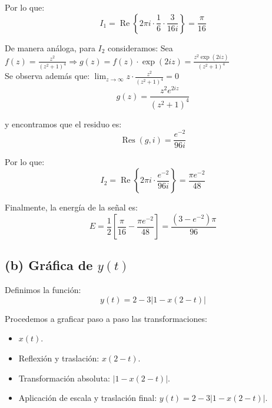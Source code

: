 \documentclass[a4paper,12pt]{article}
\begin{document}
Por lo que:
\begin{equation*}
    I_1 = \operatorname{Re} \left\{ 2 \pi i \cdot \frac{1}{6} \cdot \frac{3}{16 i} \right\} = \frac{\pi}{16}
\end{equation*}

De manera análoga, para $I_2$ consideramos:
Sea\\
$f(z)=\frac{z^{2}}{\left(z^{2}+1\right)^{4}} \Rightarrow g(z)=f(z) \cdot \exp (2 i z)=\frac{z^{2} \exp (2 i z)}{\left(z^{2}+1\right)^{4}}$\\
Se observa además que: $\lim _{z \rightarrow \infty} z \cdot \frac{z^{2}}{\left(z^{2}+1\right)^{4}}=0$\\
\begin{equation*}
    g(z) = \frac{z^2 e^{2iz}}{(z^2+1)^4}
\end{equation*}

y encontramos que el residuo es:
\begin{equation*}
    \operatorname{Res}(g, i) = \frac{e^{-2}}{96 i}
\end{equation*}

Por lo que:
\begin{equation*}
    I_2 = \operatorname{Re} \left\{ 2 \pi i \cdot \frac{e^{-2}}{96 i} \right\} = \frac{\pi e^{-2}}{48}
\end{equation*}

Finalmente, la energía de la señal es:
\begin{equation*}
    E = \frac{1}{2} \left[ \frac{\pi}{16} - \frac{\pi e^{-2}}{48} \right] = \frac{(3-e^{-2}) \pi}{96}
\end{equation*}

\subsection*{(b) Gráfica de $y(t)$}

Definimos la función:
\begin{equation*}
    y(t) = 2 - 3 \left| 1 - x(2-t) \right|
\end{equation*}

Procedemos a graficar paso a paso las transformaciones:

\begin{itemize}
    \item $x(t)$.
    \item Reflexión y traslación: $x(2-t)$.
    \item Transformación absoluta: $|1 - x(2-t)|$.
    \item Aplicación de escala y traslación final: $y(t) = 2 - 3|1-x(2-t)|$.
\end{itemize}
\end{document}
